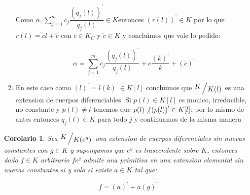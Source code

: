 \documentclass[11pt]{article}
\newcommand{\quotient}[2]{{\raisebox{.2em}{$#1$}\left/\raisebox{-.2em}{$#2$}\right.}}
\newcommand{\derivation}[1]{\left(#1\right)^\prime}
\newcommand{\constants}[1]{#1_C}
\numberwithin{theorem}{subsection}
\newtheorem{corollary}[theorem]{Corolario}
\newenvironment{proof}[1][Demostraci\'on]{\begin{trivlist}
		\item[\hskip \labelsep {\bfseries #1}]}{\end{trivlist}}
\newcommand{\qed}{\nobreak \ifvmode \relax \else
	\ifdim\lastskip<1.5em \hskip-\lastskip
	\hskip1.5em plus0em minus0.5em \fi \nobreak
	\vrule height0.75em width0.5em depth0.25em\fi}
\begin{document}
\begin{proof}
\begin{enumerate}
		Como $\alpha, \sum\limits_{j=1}^{m} c_j \dfrac{\derivation{q_j(l)}}{q_j(l)}  \in K$entonces $ \derivation{r(l)} \in K$ por lo que $r(l) = cl + \check{c}$ con $c \in \constants{K}$ y $\check{c} \in K$ y concluimos que vale lo pedido:
		
		\begin{equation}
			\alpha = \sum\limits_{j=1}^{m} c_j \dfrac{\derivation{q_j(l)}}{q_j(l)} + c \dfrac{\derivation{k}}{k} + \derivation{\check{c}}
		\end{equation}
		
		\item [$l$ es exponencial]
		
		En este caso como $\derivation{l} = l \derivation{k} \in K[l]$ concluimos que $\quotient{K}{K(l)}$ es una extension de cuerpos diferenciables. Si $p(l) \in K[l]$ es monico, irreducible, no constante y $p(l) \neq l$ tenemos que $p(l) \not\vert \derivation{p(l)} \in K[l]$; por lo mismo de antes entonces $q_j(l) \in K$ para todo $j$ y continuamos de la misma manera \qed
	\end{enumerate}
	
\end{proof}

\begin{corollary}
	Sea $\quotient{K}{K(e^g)}$ una extension de cuerpos diferenciales sin nuevas constantes con $g \in K$ y supongamos que $e^g$ es trascendente sobre $K$, entonces dado $f \in K$ arbitrario $fe^g$ admite una primitiva  en una extension elemental sin nuevas constantes si y solo si existe $a\in K$ tal que:
	
	\begin{equation}
		f = \derivation{a} + a\derivation{g}
	\end{equation}
\end{corollary}
\end{document}
